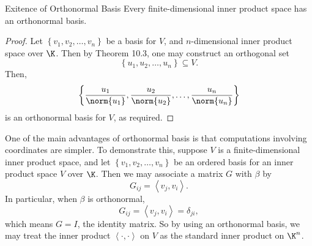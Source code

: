 \documentclass[linearalgebra]{subfiles}
\begin{document}
    \begin{cor}{Exitence of Orthonormal Basis}
        Every finite-dimensional inner product space has an orthonormal basis.
    \end{cor}	

    \begin{proof}
        Let $\left\lbrace v_1,v_2,\ldots,v_n \right\rbrace$ be a basis for $V$, and $n$-dimensional inner product space over $\K$. Then by Theorem 10.3, one may construct an orthogonal set
        \begin{equation*}
            \left\lbrace u_1,u_2,\ldots,u_n \right\rbrace \subseteq V.
        \end{equation*}
        Then,
        \begin{equation*}
            \left\lbrace \frac{u_1}{\norm{u_1}}, \frac{u_2}{\norm{u_2}}, \ldots, \frac{u_n}{\norm{u_n}} \right\rbrace 
        \end{equation*}
        is an orthonormal basis for $V$, as required.
    \end{proof}

    \begin{remark}
        One of the main advantages of orthonormal basis is that computations involving coordinates are simpler. To demonstrate this, suppose $V$ is a finite-dimensional inner product space, and let
        $\left\lbrace v_1,v_2,\ldots,v_n \right\rbrace$ be an ordered basis for an inner product space $V$ over $\K$. Then we may associate a matrix $G$ with $\beta$ by 
        \begin{equation*}
            G_{ij} = \left\langle v_j, v_i\right\rangle .
        \end{equation*}
        In particular, when $\beta$ is orthonormal,
        \begin{equation*}
            G_{ij} = \left\langle v_j, v_i\right\rangle = \delta_{ji},
        \end{equation*}
        which means $G=I$, the identity matrix. So by using an orthonormal basis, we may treat the inner product $\left\langle \cdot, \cdot\right\rangle$ on $V$ as the standard inner product on $\K^n$.
    \end{remark}
\end{document}
